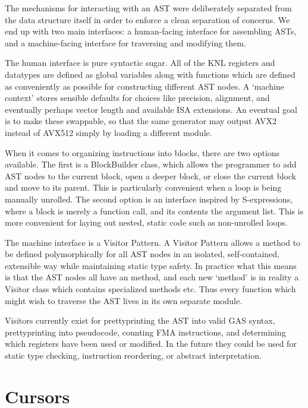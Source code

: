 The mechanisms for interacting with an AST were deliberately separated from the data structure itself in order to enforce a clean separation of concerns. We end up with two main interfaces: a human-facing interface for assembling ASTs, and a machine-facing interface for traversing and modifying them. 

The human interface is pure syntactic sugar. All of the KNL registers and datatypes are defined as global variables along with functions which are defined as conveniently as possible for constructing different AST nodes. A `machine context' stores sensible defaults for choices like precision, alignment, and eventually perhaps vector length and available ISA extensions. An eventual goal is to make these swappable, so that the same generator may output AVX2 instead of AVX512 simply by loading a different module.

When it comes to organizing instructions into blocks, there are two options available. The first is a BlockBuilder class, which allows the programmer to add AST nodes to the current block, open a deeper block, or close the current block and move to its parent. This is particularly convenient when a loop is being manually unrolled. The second option is an interface inspired by S-expressions, where a block is merely a function call, and its contents the argument list. This is more convenient for laying out nested, static code such as non-unrolled loops.

The machine interface is a Visitor Pattern. A Visitor Pattern allows a method to be defined polymorphically for all AST nodes in an isolated, self-contained, extensible way while maintaining static type safety. In practice what this means is that the AST nodes all have an  method, and each new `method' is in reality a Visitor class which contains specialized methods  etc. Thus every function which might wish to traverse the AST lives in its own separate module.

Visitors currently exist for prettyprinting the AST into valid GAS syntax, prettyprinting into pseudocode, counting FMA instructions, and determining which registers have been used or modified. In the future they could be used for static type checking, instruction reordering, or abstract interpretation.

\section{Cursors}
\label{section:cursors}

